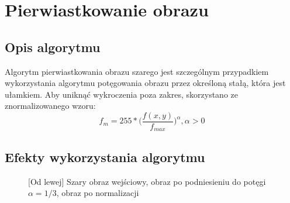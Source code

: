 \documentclass[a4paper,12pt, titlepage]{report}
\begin{document}
\section{Pierwiastkowanie obrazu}
\subsection*{Opis algorytmu}
\par Algorytm pierwiastkowania obrazu szarego jest szczególnym przypadkiem wykorzystania algorytmu potęgowania obrazu przez określoną stałą, która jest ułamkiem. Aby uniknąć wykroczenia poza zakres, skorzystano ze znormalizowanego wzoru: \[f_{m}=255*\Big(\frac{f(x,y)}{f_{max}}\Big)^{\alpha},  \alpha>0\]
\subsection*{Efekty wykorzystania algorytmu}
\begin{figure}[h]
    \centering
    \caption{[Od lewej] Szary obraz wejściowy, obraz po podniesieniu do potęgi \(\alpha=1/3\), obraz po normalizacji}%
    \label{fig:rysunek}%
\end{figure}
\end{document}
